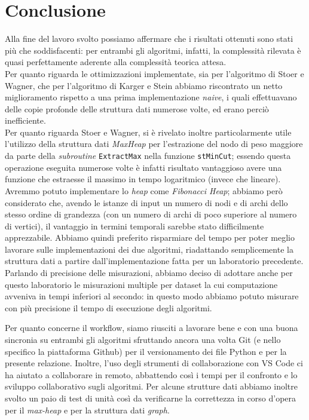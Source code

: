 \section{Conclusione}

Alla fine del lavoro svolto possiamo affermare che i risultati ottenuti sono stati più che soddisfacenti: per entrambi gli algoritmi, infatti, la complessità rilevata è quasi perfettamente aderente alla complessità teorica attesa. \\
Per quanto riguarda le ottimizzazioni implementate, sia per l'algoritmo di Stoer e Wagner, che per l'algoritmo di Karger e Stein abbiamo riscontrato un netto miglioramento rispetto a una prima implementazione \textit{naive}, i quali effettuavano delle copie profonde delle struttura dati numerose volte, ed erano perciò inefficiente.\\
Per quanto riguarda Stoer e Wagner, si è rivelato inoltre particolarmente utile l'utilizzo della struttura dati \textit{MaxHeap} per l'estrazione del nodo di peso maggiore da parte della \textit{subroutine} \texttt{ExtractMax} nella funzione \texttt{stMinCut}; essendo questa operazione eseguita numerose volte è infatti risultato vantaggioso avere una funzione che estraesse il massimo in tempo logaritmico (invece che lineare). \\
Avremmo potuto implementare lo \textit{heap} come \textit{Fibonacci Heap}; abbiamo però considerato che, avendo le istanze di input un numero di nodi e di archi dello stesso ordine di grandezza (con un numero di archi di poco superiore al numero di vertici), il vantaggio in termini temporali sarebbe stato difficilmente apprezzabile. Abbiamo quindi preferito risparmiare del tempo per poter meglio lavorare sulle implementazioni dei due algoritmi, riadattando semplicemente la struttura dati a partire dall'implementazione fatta per un laboratorio precedente.\\
Parlando di precisione delle misurazioni, abbiamo deciso di adottare anche per questo laboratorio le misurazioni multiple per dataset la cui computazione avveniva in tempi inferiori al secondo: in questo modo abbiamo potuto misurare con più precisione il tempo di esecuzione degli algoritmi.

Per quanto concerne il workflow, siamo riusciti a lavorare bene e con una buona sincronia su entrambi gli algoritmi sfruttando ancora una volta Git (e nello specifico la piattaforma Github) per il versionamento dei file Python e per la presente relazione. Inoltre, l'uso degli strumenti di collaborazione con VS Code ci ha aiutato a collaborare in remoto, abbattendo così i tempi per il confronto e lo sviluppo collaborativo sugli algoritmi. Per alcune strutture dati abbiamo inoltre svolto un paio di test di unità così da verificarne la correttezza in corso d'opera per il \textit{max-heap} e per la struttura dati \textit{graph}. 

